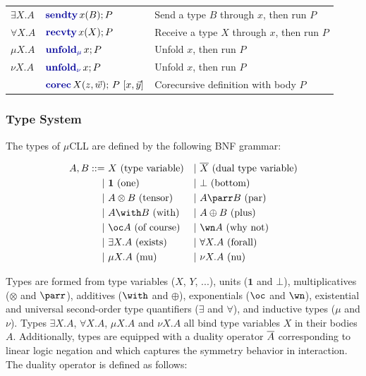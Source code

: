 \begin{table}
\begin{tabular}{lll}
        $\exists X.A$ & $\sendtyc{x}{B}{P}$                               & Send a type $B$ through $x$, then run $P$             \\
        $\forall X.A$ & $\recvtyc{x}{X}{P}$                               & Receive a type $X$ through $x$, then run $P$          \\
        $\mu X.A$     & $\unfoldmuc{x}{P}$                                & Unfold $x$, then run $P$                              \\
        $\nu X.A$     & $\unfoldnuc{x}{P}$                                & Unfold $x$, then run $P$                              \\
                      & $\corecc{X}{z, \vec{w}}{P}{x, \vec{y}}$           & Corecursive definition with body $P$                  \\
        \bottomrule
    \end{tabular}
\end{table}

\subsubsection{Type System}

The types of $\mu$CLL are defined by the following BNF grammar:

\begin{align*}
    A, B ::=\  & X \text{ (type variable)}    &  & |\ \dual{X} \text{ (dual type variable)} \\
    |\         & \mathbf{1} \text{ (one)}     &  & |\ \bot \text{ (bottom)}                 \\
    |\         & A \otimes B \text{ (tensor)} &  & |\ A \parr B \text{ (par)}               \\
    |\         & A \with B \text{ (with)}     &  & |\ A \oplus B \text{ (plus)}             \\
    |\         & \oc A \text{ (of course)}    &  & |\ \wn A \text{ (why not)}               \\
    |\         & \exists X.A \text{ (exists)} &  & |\ \forall X.A \text{ (forall)}          \\
    |\         & \mu X.A \text{ (mu)}         &  & |\ \nu X.A \text{ (nu)}
\end{align*}

Types are formed from type variables ($X$, $Y$, ...), units ($\mathbf{1}$ and $\bot$), multiplicatives ($\otimes$ and $\parr$), additives ($\with$ and $\oplus$), exponentials ($\oc$ and $\wn$), existential and universal second-order type quantifiers ($\exists$ and $\forall$), and inductive types ($\mu$ and $\nu$). Types $\exists X.A$, $\forall X.A$, $\mu X.A$ and $\nu X.A$ all bind type variables $X$ in their bodies $A$. Additionally, types are equipped with a duality operator $\overline{A}$ corresponding to linear logic negation and which captures the symmetry behavior in interaction. The duality operator is defined as follows:

